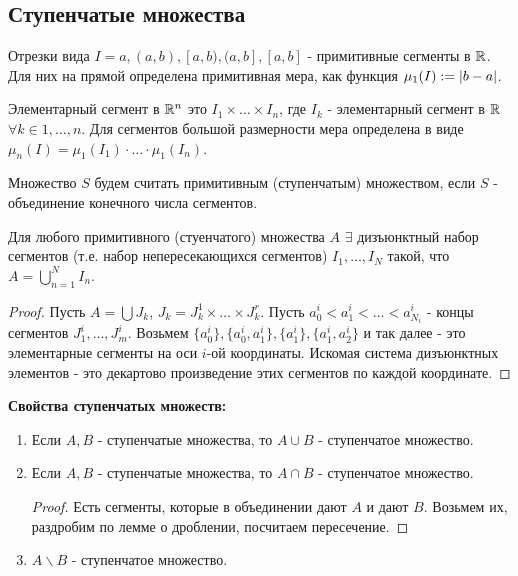 \subsection{Ступенчатые множества}
\begin{definition*}
    Отрезки вида $I = {a}, (a,b), [a,b), (a, b], [a,b]$ - примитивные сегменты в $\mathbb{R}$. Для них на прямой определена примитивная мера, как функция $\mu_1(I) := \left| b-a \right|$. \par
    Элементарный сегмент в $\mathbb{R}^n$ это $I_1 \times \hdots \times I_n$, где $I_k$ - элементарный сегмент в $\mathbb{R}$ $\forall k \in {1, \hdots, n}$. Для сегментов большой размерности мера определена в виде $\mu_n(I) = \mu_1(I_1) \cdot \hdots \cdot \mu_1(I_n)$.\par
    Множество $S$ будем считать примитивным (ступенчатым) множеством, если $S$ - объединение конечного числа сегментов.
\end{definition*}

\begin{lemma*}
    Для любого примитивного (стуенчатого) множества $A$ $\exists$ дизъюнктный набор сегментов (т.е. набор непересекающихся сегментов) $I_1, \hdots, I_N$ такой, что $A = \bigcup_{n=1}^{N} I_n$.

    \begin{proof}
        Пусть $A = \bigcup J_k$, $J_k = J_k^1 \times \hdots \times J_k^r$. Пусть $a_0^i < a_1^i < \hdots < a_{N_i}^i$ - концы сегментов $J_1^i, \hdots, J_m^i$. Возьмем $\{a_0^i\}, \{a_0^i, a_1^i\}, \{a_1^i\}, \{a_1^i, a_2^i\}$ и так далее - это элементарные сегменты на оси $i$-ой координаты. Искомая система дизъюнктных элементов - это декартово произведение этих сегментов по каждой координате.
    \end{proof}
\end{lemma*}

\textbf{Свойства ступенчатых множеств:}
\begin{enumerate}
    \item Если $A, B$ - ступенчатые множества, то $A \cup B$ - ступенчатое множество.
    \item Если $A, B$ - ступенчатые множества, то $A \cap B$ - ступенчатое множество.
    \begin{proof}
        Есть сегменты, которые в объединении дают $A$ и дают $B$. Возьмем их, раздробим по лемме о дроблении, посчитаем пересечение. 
    \end{proof}
    \item $A \backslash B$ - ступенчатое множество.
\end{enumerate}

